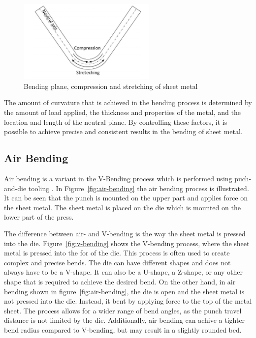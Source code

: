 \begin{figure}[h]
    \begin{tcolorbox}[arc=0pt,boxrule=0.5pt, colback=white]
        \centering
        \includegraphics[width=0.6\textwidth]{chap2/images/neutral-plane}
    \end{tcolorbox}
    \caption{Bending plane, compression and stretching of sheet
    metal~\cite[p. 3]{baig_machinelearningprediction_2021}}
    \label{fig:neutral-plane}
\end{figure}

The amount of curvature that is achieved in the bending process is determined by the
amount of load applied, the thickness and properties of the metal, and the location and length of the neutral plane.
By controlling these factors, it is possible to achieve precise and consistent results in the bending of sheet metal.

\subsection{Air Bending}\label{subsec:air-bending}
Air bending is a variant in the V-Bending process which is performed using puch-and-die
tooling
\cite[p. 416]{groover_fundamentalsmodernmanufacturing_2020}.
In Figure~\ref{fig:air-bending} the air bending process is illustrated.
It can be seen that the punch is mounted on the upper part and applies force on the
sheet metal.
The sheet metal is placed on the die which is mounted on the lower part of the press.


The difference between air- and V-bending is the way the sheet metal is pressed into the die.
Figure~\ref{fig:v-bending} shows the V-bending process, where the sheet metal is pressed into the for of the die.
This process is often used to create complex and precise bends. The die can have different shapes and does not always
have to be a V-shape.
It can also be a U-shape, a Z-shape, or any other shape that is required to achieve the desired bend.
On the other hand, in air bending shown in figure~\ref{fig:air-bending}, the die is open and the sheet metal is not
pressed into the die.
Instead, it bent by applying force to the top of the metal sheet.
The process allows for a wider range of bend angles, as the punch travel distance is not limited by the die.
Additionally, air bending can achive a tighter bend radius compared to V-bending, but may result in a slightly
rounded bed.

